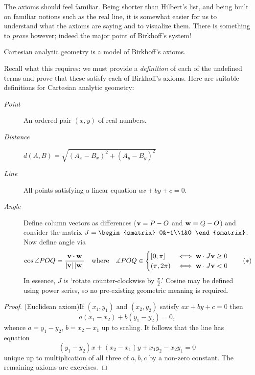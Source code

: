 
The axioms should feel familiar. Being shorter than Hilbert's list, and being built on familiar notions such as the real line, it is somewhat easier for us to understand what the axioms are saying and to visualize them. There is something to \emph{prove} however; indeed the major point of Birkhoff's system!

\begin{thm}{}{}
Cartesian analytic geometry is a model of Birkhoff's axioms.
\end{thm}

Recall what this requires: we must provide a \emph{definition} of each of the undefined terms and prove that these satisfy each of Birkhoff's axioms. Here are suitable definitions for Cartesian analytic geometry:
\begin{description}
	\item[\normalfont\emph{Point}] An ordered pair $(x,y)$ of real numbers.
	\item[\normalfont\emph{Distance}] $d(A,B)=\sqrt{(A_x-B_x)^2+(A_y-B_y)^2}$
	\item[\normalfont\emph{Line}] All points satisfying a linear equation $ax+by+c=0$.
	\item[\normalfont\emph{Angle}] Define column vectors as differences (${\mathbf{v}}=P-O$ and ${\mathbf{w}}=Q-O$) and consider the matrix $J=\begin{smatrix}
	0&-1\\1&0
	\end{smatrix}$. Now define angle via
	\[\cos\measuredangle POQ=\frac{{\mathbf{v}}\cdot{\mathbf{w}}}{\left| {\mathbf{v}}\right|\left| {\mathbf{w}}\right|}\quad\text{where}\quad
\measuredangle POQ\in\begin{cases}
[0,\pi]&\iff{\mathbf{w}}\cdot J{\mathbf{v}}\ge 0\\
(\pi,2\pi)&\iff{\mathbf{w}}\cdot J{\mathbf{v}}< 0
\end{cases} \tag{$\ast$}\]
In essence, $J$ is `rotate counter-clockwise by $\frac\pi 2$.' Cosine may be defined using power series, so no pre-existing geometric meaning is required.
\end{description}

\begin{proof}
(Euclidean axiom)\quad If $(x_1,y_1)$ and $(x_2,y_2)$ satisfy $ax+by+c=0$ then
\[a(x_1-x_2)+b(y_1-y_2)=0,\]
whence $a=y_1-y_2$, $b=x_2-x_1$ up to scaling. It follows that the line has equation
\[(y_1-y_2)x+(x_2-x_1)y+x_1y_2-x_2y_1=0\]
unique up to multiplication of all three of $a,b,c$ by a non-zero constant.\smallbreak
The remaining axioms are exercises.
\end{proof}


